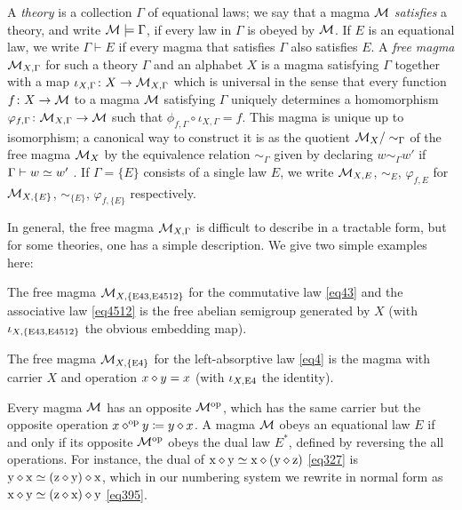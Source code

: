 A \emph{theory} is a collection $\Gamma$ of equational laws; we say that a magma ${\mathcal{M}}$ \emph{satisfies} a theory, and write ${\mathcal{M}} \models \Gamma$, if every law in $\Gamma$ is obeyed by ${\mathcal{M}}$.  If $E$ is an equational law, we write $\Gamma \vdash E$ if every magma that satisfies $\Gamma$ also satisfies $E$. A \emph{free magma} ${\mathcal{M}}_{X,\Gamma}$ for such a theory $\Gamma$ and an alphabet $X$ is a magma satisfying $\Gamma$ together with a map $\iota_{X,\Gamma} \colon X \to {\mathcal{M}}_{X,\Gamma}$ which is universal in the sense that every function $f \colon X \to {\mathcal{M}}$ to a magma ${\mathcal{M}}$ satisfying $\Gamma$ uniquely determines a homomorphism $\varphi_{f,\Gamma} \colon {\mathcal{M}}_{X,\Gamma} \to {\mathcal{M}}$ such that $\phi_{f,\Gamma} \circ \iota_{X,\Gamma} = f$.  This magma is unique up to isomorphism; a canonical way to construct it is as the quotient ${\mathcal{M}}_X/\sim_\Gamma$ of the free magma ${\mathcal{M}}_X$ by the equivalence relation $\sim_\Gamma$ given by declaring $w \sim_\Gamma w'$ if $\Gamma \vdash w \simeq w'$ \cite[Theorem 3.5.6]{term-rewriting}.  If $\Gamma = \{E\}$ consists of a single law $E$, we write ${\mathcal{M}}_{X,E}$, $\sim_E$, $\varphi_{f,E}$ for ${\mathcal{M}}_{X,\{E\}}$, $\sim_{\{E\}}$, $\varphi_{f,\{E\}}$ respectively.

In general, the free magma ${\mathcal{M}}_{X,\Gamma}$ is difficult to describe in a tractable form, but for some theories, one has a simple description.  We give two simple examples here:

\begin{example}\label{semi-group} The free magma ${\mathcal{M}}_{X,\{\mathrm{E}43, \mathrm{E}4512\}}$ for the commutative law \eqref{eq43} and the associative law \eqref{eq4512} is the free abelian semigroup generated by $X$ (with $\iota_{X,\{\mathrm{E}43,\mathrm{E}4512\}}$ the obvious embedding map).
\end{example}

\begin{example}\label{left-absorb}
The free magma ${\mathcal{M}}_{X,\{\mathrm{E}4\}}$ for the left-absorptive law \eqref{eq4} is the magma with carrier $X$ and operation $x \diamond y = x$ (with $\iota_{X,\mathrm{E}4}$ the identity).
\end{example}


Every magma ${\mathcal{M}}$ has an opposite ${\mathcal{M}}^{\mathrm{op}}$, which has the same carrier but the opposite operation $x \diamond^{\mathrm{op}} y \coloneqq y \diamond x$.  A magma ${\mathcal{M}}$ obeys an equational law $E$ if and only if its opposite ${\mathcal{M}}^{\mathrm{op}}$ obeys the dual law $E^*$, defined by reversing the all operations.  For instance, the dual of
$\mathrm{x} \diamond \mathrm{y} \simeq \mathrm{x} \diamond (\mathrm{y} \diamond \mathrm{z})$ \eqref{eq327} is $\mathrm{y} \diamond \mathrm{x} \simeq (\mathrm{z} \diamond \mathrm{y}) \diamond \mathrm{x}$, which in our numbering system we rewrite in normal form as $\mathrm{x} \diamond \mathrm{y} \simeq (\mathrm{z} \diamond \mathrm{x}) \diamond \mathrm{y}$ \eqref{eq395}.

